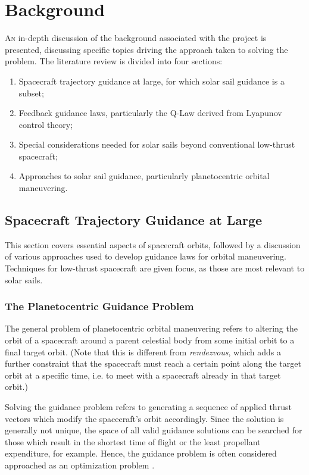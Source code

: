 \chapter{Background}

\lettrine{A}{n} in-depth discussion of the background associated with the project is presented, discussing specific topics driving the approach taken to solving the problem. The literature review is divided into four sections:
\begin{enumerate}
  \item Spacecraft trajectory guidance at large, for which solar sail guidance is a subset;
  \item Feedback guidance laws, particularly the Q-Law derived from Lyapunov control theory;
  \item Special considerations needed for solar sails beyond conventional low-thrust spacecraft;
  \item Approaches to solar sail guidance, particularly planetocentric orbital maneuvering.
\end{enumerate}

\section{Spacecraft Trajectory Guidance at Large}

This section covers essential aspects of spacecraft orbits, followed by a discussion of various approaches used to develop guidance laws for orbital maneuvering. Techniques for low-thrust spacecraft are given focus, as those are most relevant to solar sails.

\subsection{The Planetocentric Guidance Problem}
The general problem of planetocentric orbital maneuvering refers to altering the orbit of a spacecraft around a parent celestial body from some initial orbit to a final target orbit. (Note that this is different from \textit{rendezvous}, which adds a further constraint that the spacecraft must reach a certain point along the target orbit at a specific time, i.e. to meet with a spacecraft already in that target orbit.)



Solving the guidance problem refers to generating a sequence of applied thrust vectors which modify the spacecraft's orbit accordingly. Since the solution is generally not unique, the space of all valid guidance solutions can be searched for those which result in the shortest time of flight or the least propellant expenditure, for example. Hence, the guidance problem is often considered approached as an optimization problem \cite{yam2011low}.

